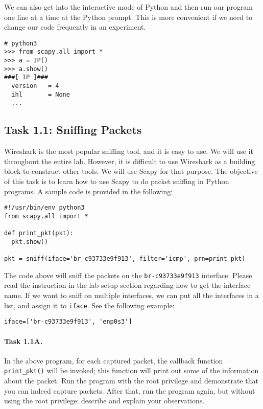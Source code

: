 We can also get into the interactive mode of Python and
then run our program one line at a time at the Python prompt. 
This is more convenient if we need to change our code 
frequently in an experiment.

\begin{lstlisting}
# python3
>>> from scapy.all import *
>>> a = IP()
>>> a.show()
###[ IP ]###
  version   = 4
  ihl       = None
  ...
\end{lstlisting}
 

\subsection{Task 1.1: Sniffing Packets}  


Wireshark is the most popular sniffing tool, and it is easy to use. We will use it throughout 
the entire lab. However, it is difficult to use Wireshark as a building block 
to construct other tools. We will use Scapy for that purpose. The objective of this task is to
learn how to use Scapy to do packet sniffing in Python programs. 
A sample code is provided in the following:


\begin{lstlisting}
#!/usr/bin/env python3
from scapy.all import *

def print_pkt(pkt):
  pkt.show()

pkt = sniff(iface='br-c93733e9f913', filter='icmp', prn=print_pkt)
\end{lstlisting}


The code above will sniff the packets on the \texttt{br-c93733e9f913}
interface. Please read the instruction in the lab setup section
regarding how to get the interface name. 
If we want to sniff on multiple interfaces, we can
put all the interfaces in a list, and assign it to \texttt{iface}.
See the following example: 


\begin{lstlisting}
iface=['br-c93733e9f913', 'enp0s3']
\end{lstlisting}
 


\paragraph{Task 1.1A.} In the above program, for each captured
packet, the callback function \texttt{print\_pkt()} will be invoked; this function will print out some of
the information about the packet. Run the program with the root privilege and demonstrate that
you can indeed capture packets. After that, run the program again, but without using the root
privilege; describe and explain your observations. 
 
